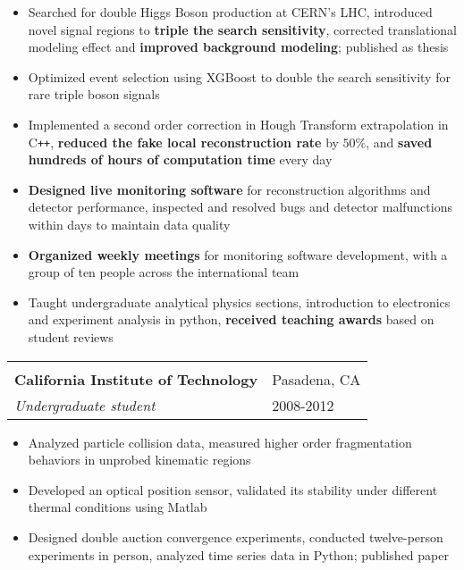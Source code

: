 \documentclass[letterpaper,11pt,oneside]{article}
\begin{document}
 \begin{flushleft}
  \begin{small}
 \begin{itemize}[leftmargin=*]
  \item Searched for double Higgs Boson production at CERN's LHC, introduced novel signal regions to \textbf{triple the search sensitivity}, corrected translational modeling effect and \textbf{improved background modeling}; published as thesis
  \item Optimized event selection using XGBoost to double the search sensitivity for rare triple boson signals
  \item Implemented a second order correction in Hough Transform extrapolation in C\texttt{++}, \textbf{reduced the fake local reconstruction rate} by $50\%$, and \textbf{saved hundreds of hours of computation time} every day
   \item\textbf{Designed live monitoring software} for reconstruction algorithms and detector performance, inspected and resolved bugs and detector malfunctions within days to maintain data quality
  \item \textbf{Organized weekly meetings} for monitoring software development, with a group of ten people across the international team
  \item Taught undergraduate analytical physics sections, introduction to electronics and experiment analysis in python, \textbf{received teaching awards} based on student reviews
 \end{itemize}
  \end{small}
 \end{flushleft}
 \begin{flushleft}
 \vspace{-0.25cm}
 \begin{tabular}{@{} l l }
    \hspace{0.8\linewidth} & \hspace{0.1\linewidth} \\
    \textbf{California Institute of Technology} & Pasadena, CA \\ 
    \textit{Undergraduate student} & 2008-2012 \\ 
 \end{tabular}
 \end{flushleft}
 \begin{flushleft}
  \begin{small}
 \begin{itemize}[leftmargin=*]
 \item Analyzed particle collision data, measured higher order fragmentation behaviors in unprobed kinematic regions
 \item Developed an optical position sensor, validated its stability under different thermal conditions using Matlab
 \item Designed double auction convergence experiments, conducted twelve-person experiments in person, analyzed time series data in Python; published paper
 \end{itemize}
  \end{small}
 \end{flushleft}
\end{document}
